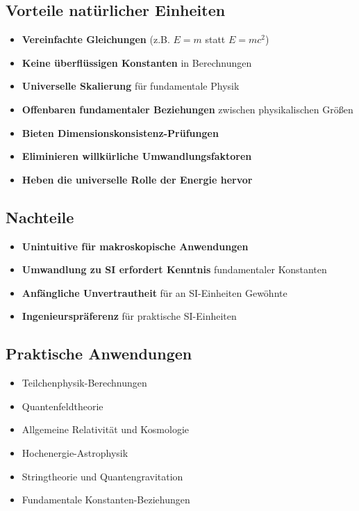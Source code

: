 \documentclass[11pt,a4paper]{article}
\begin{document}
	\subsection{Vorteile natürlicher Einheiten}
	\begin{itemize}
		\item \textbf{Vereinfachte Gleichungen} (z.B. $E = m$ statt $E = mc^2$)
		\item \textbf{Keine überflüssigen Konstanten} in Berechnungen
		\item \textbf{Universelle Skalierung} für fundamentale Physik
		\item \textbf{Offenbaren fundamentaler Beziehungen} zwischen physikalischen Größen
		\item \textbf{Bieten Dimensionskonsistenz-Prüfungen}
		\item \textbf{Eliminieren willkürliche Umwandlungsfaktoren}
		\item \textbf{Heben die universelle Rolle der Energie hervor}
	\end{itemize}
	
	\subsection{Nachteile}
	\begin{itemize}
		\item \textbf{Unintuitive für makroskopische Anwendungen}
		\item \textbf{Umwandlung zu SI erfordert Kenntnis} fundamentaler Konstanten
		\item \textbf{Anfängliche Unvertrautheit} für an SI-Einheiten Gewöhnte
		\item \textbf{Ingenieurspräferenz} für praktische SI-Einheiten
	\end{itemize}
	
	\subsection{Praktische Anwendungen}
	\begin{itemize}
		\item Teilchenphysik-Berechnungen
		\item Quantenfeldtheorie
		\item Allgemeine Relativität und Kosmologie
		\item Hochenergie-Astrophysik
		\item Stringtheorie und Quantengravitation
		\item Fundamentale Konstanten-Beziehungen
	\end{itemize}
	
\end{document}
